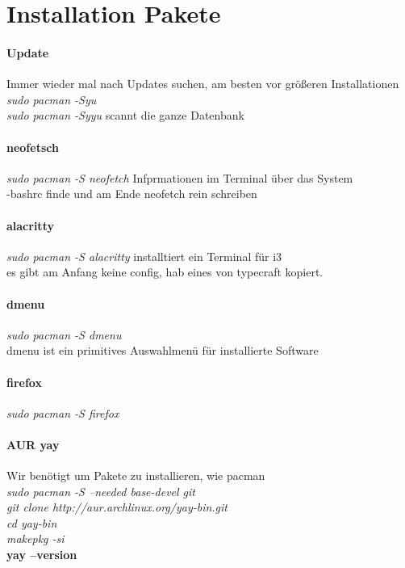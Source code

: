 \documentclass[10pt,a4paper,twoside]{book}
\begin{document}
\section{Installation Pakete}
\paragraph{Update}
Immer wieder mal nach Updates suchen, am besten vor größeren Installationen\\
\textit{sudo pacman -Syu}\\
\textit{sudo pacman -Syyu} scannt die ganze Datenbank\\
\paragraph{neofetsch}
\textit{sudo pacman -S neofetch} Infprmationen im Terminal über das System\\
-bashrc finde und am Ende neofetch rein schreiben\\
\paragraph{alacritty}
\textit{sudo pacman -S alacritty} installtiert ein Terminal für i3\\
es gibt am Anfang keine config, hab eines von typecraft kopiert.\\
\paragraph{dmenu}
\textit{sudo pacman -S dmenu}\\
dmenu ist ein primitives Auswahlmenü für installierte Software\\
\paragraph{firefox}
\textit{sudo pacman -S firefox}
\paragraph{AUR yay}
Wir benötigt um Pakete zu installieren, wie pacman\\
\textit{sudo pacman -S --needed base-devel git}\\
\textit{git clone http://aur.archlinux.org/yay-bin.git}\\
\textit{cd yay-bin}\\
\textit{makepkg -si}\\
\textbf{yay --version}\\
\end{document}
